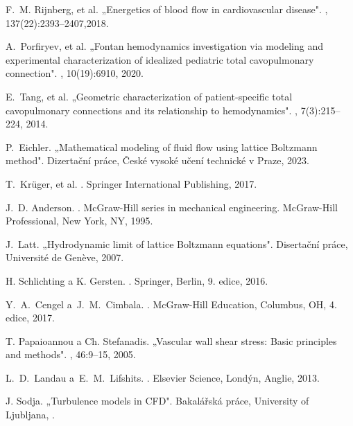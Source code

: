 \begin{thebibliography}{10}
	F.~M. Rijnberg, et al.
	\newblock „{E}nergetics of blood flow in cardiovascular disease".
	,
	137(22):2393--2407,2018.
	
	A.~Porfiryev, et al.
	\newblock „{F}ontan hemodynamics investigation via modeling and experimental
	characterization of idealized pediatric total cavopulmonary connection".
	, 10(19):6910, 2020.
	
	E.~Tang, et al.
	\newblock „{G}eometric characterization of patient-specific total cavopulmonary
	connections and its relationship to hemodynamics".
	, 7(3):215--224, 2014.
	
	P.~Eichler.
	\newblock „Mathematical modeling of fluid flow using lattice Boltzmann method".
	\newblock Dizertační práce, České vysoké učení technické v Praze, 2023.
	
	T.~Kr\"{u}ger{, et al.}
	.
	\newblock Springer International Publishing, 2017.
	
	J.~D. Anderson.
	.
	\newblock McGraw-Hill series in mechanical engineering. McGraw-Hill
	Professional, New York, NY, 1995.
	
	J.~Latt.
	\newblock „{H}ydrodynamic limit of lattice Boltzmann equations". Disertační práce, Université de Genève, 2007.
	
	H. Schlichting a K. Gersten.
	.
	\newblock Springer, Berlin, 9. edice, 2016.
	
	Y.~A.~Cengel a~J.~M.~Cimbala.
	.
	\newblock McGraw-Hill Education, Columbus, OH, 4. edice, 2017.
	
	T. Papaioannou a Ch. Stefanadis.
	\newblock „{V}ascular wall shear stress: Basic principles and methods".
	, 46:9--15, 2005.
	
	L.~D.~Landau a~E.~M.~Lifshits.
	.
	\newblock Elsevier Science, Londýn, Anglie, 2013.
	
	J. Sodja.
	\newblock „Turbulence models in CFD".
	\newblock Bakalářská práce, University of Ljubljana, .
	

\end{thebibliography}
